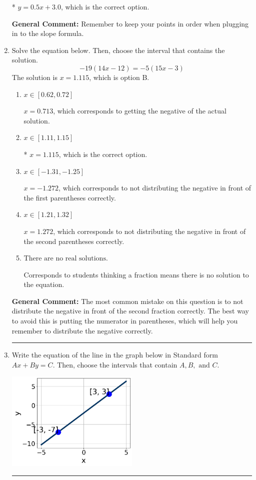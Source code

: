 \documentclass{extbook}[14pt]
\newcommand{\litem}[1]{\item #1

\rule{\textwidth}{0.4pt}}
\begin{document}
\begin{enumerate}
{\begin{enumerate}[label=\Alph*.]
* $y = 0.5x + 3.0$, which is the correct option.
\end{enumerate}

\textbf{General Comment:} Remember to keep your points in order when plugging in to the slope formula.
}
\litem{
Solve the equation below. Then, choose the interval that contains the solution.
\[ -19(14x -12) = -5(15x -3) \]The solution is \( x = 1.115 \), which is option B.\begin{enumerate}[label=\Alph*.]
\item \( x \in [0.62, 0.72] \)

$x = 0.713$, which corresponds to getting the negative of the actual solution.
\item \( x \in [1.11, 1.15] \)

* $x = 1.115$, which is the correct option.
\item \( x \in [-1.31, -1.25] \)

$x = -1.272$, which corresponds to not distributing the negative in front of the first parentheses correctly.
\item \( x \in [1.21, 1.32] \)

$x = 1.272$, which corresponds to not distributing the negative in front of the second parentheses correctly.
\item \( \text{There are no real solutions.} \)

Corresponds to students thinking a fraction means there is no solution to the equation.
\end{enumerate}

\textbf{General Comment:} The most common mistake on this question is to not distribute the negative in front of the second fraction correctly. The best way to avoid this is putting the numerator in parentheses, which will help you remember to distribute the negative correctly.
}
\litem{
Write the equation of the line in the graph below in Standard form $Ax+By=C$. Then, choose the intervals that contain $A, B, \text{ and } C$.

\begin{center}
    \includegraphics[width=0.5\textwidth]{../Figures/linearGraphToStandardB.png}
\end{center}


}
\end{enumerate}
\end{document}
